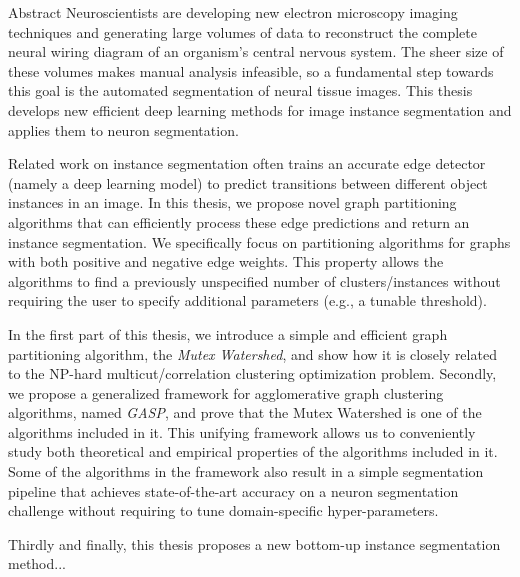 
\begin{coverpage}{Abstract}
Neuroscientists are developing new electron microscopy imaging techniques and generating large volumes of data to reconstruct the complete neural wiring diagram of an organism's central nervous system.
The sheer size of these volumes makes manual analysis infeasible, so a fundamental step towards this goal is the automated segmentation of neural tissue images. 
This thesis develops new efficient deep learning methods for image instance segmentation and applies them to neuron segmentation.

Related work on instance segmentation often trains an accurate edge detector (namely a deep learning model) to predict transitions between different object instances in an image. In this thesis, we propose novel graph partitioning algorithms that can efficiently process these edge predictions and return an instance segmentation. 
We specifically focus on partitioning algorithms for graphs with both positive and negative edge weights. This property allows the algorithms to find a previously unspecified number of clusters/instances without requiring the user to specify additional parameters (e.g., a tunable threshold).

In the first part of this thesis, we introduce a simple and efficient graph partitioning algorithm, the \emph{Mutex Watershed}, and show how it is closely related to the NP-hard multicut/correlation clustering optimization problem.
Secondly, we propose a generalized framework for agglomerative graph clustering algorithms, named \emph{GASP}, and prove that the Mutex Watershed is one of the algorithms included in it.
This unifying framework allows us to conveniently study both theoretical and empirical properties of the algorithms included in it. Some of the algorithms in the framework also result in a simple segmentation pipeline that achieves state-of-the-art accuracy on a neuron segmentation challenge without requiring to tune domain-specific hyper-parameters. 

Thirdly and finally, this thesis proposes a new bottom-up instance segmentation method...

\end{coverpage}

